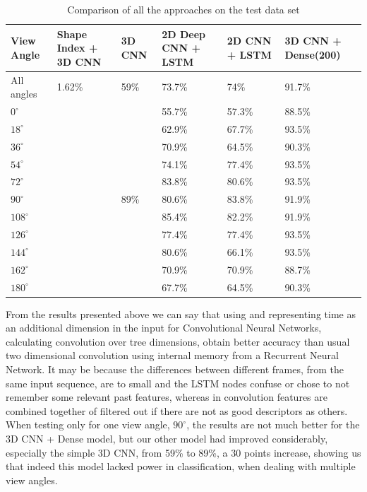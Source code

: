 \documentclass[12pt]{article}
\theoremstyle{definition}
\begin{document}
	\begin{table}[h]
		\centering
		\renewcommand{\arraystretch}{1.5}

		\caption{Comparison of all the approaches on the test data set}
		\label{table:all-results}

		\begin{tabularx}{\textwidth}{X|X|X|X|X|X}
			\textbf{View Angle} & \textbf{Shape Index + 3D CNN} & \textbf{3D CNN} & \textbf{2D Deep CNN + LSTM} & \textbf{2D CNN + LSTM} & \textbf{3D CNN + Dense(200)}\\ \hline
			All angles  & 1.62\%               & 59\%                 & 73.7\% & 74\%   & 91.7\% \\ \hline
			$0^\circ$   & \textbf{\textendash} & \textbf{\textendash} & 55.7\% & 57.3\% & 88.5\% \\ \hline
			$18^\circ$  & \textbf{\textendash} & \textbf{\textendash} & 62.9\% & 67.7\% & 93.5\% \\ \hline
			$36^\circ$  & \textbf{\textendash} & \textbf{\textendash} & 70.9\% & 64.5\% & 90.3\% \\ \hline
			$54^\circ$  & \textbf{\textendash} & \textbf{\textendash} & 74.1\% & 77.4\% & 93.5\% \\ \hline
			$72^\circ$  & \textbf{\textendash} & \textbf{\textendash} & 83.8\% & 80.6\% & 93.5\% \\ \hline
			$90^\circ$  & \textbf{\textendash} & 89\%                 & 80.6\% & 83.8\% & 91.9\% \\ \hline
			$108^\circ$ & \textbf{\textendash} & \textbf{\textendash} & 85.4\% & 82.2\% & 91.9\% \\ \hline
			$126^\circ$ & \textbf{\textendash} & \textbf{\textendash} & 77.4\% & 77.4\% & 93.5\% \\ \hline
			$144^\circ$ & \textbf{\textendash} & \textbf{\textendash} & 80.6\% & 66.1\% & 93.5\% \\ \hline
			$162^\circ$ & \textbf{\textendash} & \textbf{\textendash} & 70.9\% & 70.9\% & 88.7\% \\ \hline
			$180^\circ$ & \textbf{\textendash} & \textbf{\textendash} & 67.7\% & 64.5\% & 90.3\% \\
		\end{tabularx}
	\end{table}

	From the results presented above we can say that using and representing time as an additional dimension in the input for Convolutional Neural Networks, calculating convolution over tree dimensions, obtain better accuracy than usual two dimensional convolution using internal memory from a Recurrent Neural Network. It may be because the differences between different frames, from the same input sequence, are to small and the LSTM nodes confuse or chose to not remember some relevant past features, whereas in convolution features are combined together of filtered out if there are not as good descriptors as others. When testing only for one view angle, $90^\circ$, the results are not much better for the 3D CNN + Dense model, but our other model had improved considerably, especially the simple 3D CNN, from 59\% to 89\%, a 30 points increase, showing us that indeed this model lacked power in classification, when dealing with multiple view angles.
\end{document}
